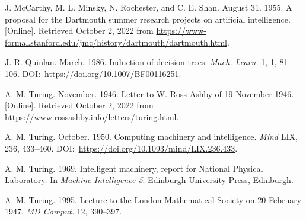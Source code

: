 \begin{thebibliography}{}
 J. McCarthy, M. L. Minsky, N. Rochester, and C. E. Shan. August 31. 1955. A proposal for the Dartmouth summer research projects on artificial intelligence. [Online]. Retrieved October 2, 2022 from \href{https://www-formal.stanford.edu/jmc/history/dartmouth/dartmouth.html}{https://{\allowbreak}www-{\allowbreak}formal.{\allowbreak}stanford.{\allowbreak}edu/{\allowbreak}jmc/{\allowbreak}history/{\allowbreak}dartmouth/{\allowbreak}dartmouth.{\allowbreak}html}.

 J. R. Quinlan. March. 1986. Induction of decision trees. \textit{Mach. Learn.} 1, 1, 81--106. DOI:~\href{https://doi.org/10.1007/BF00116251}{https://{\allowbreak}doi.{\allowbreak}org/{\allowbreak}10.{\allowbreak}1007/{\allowbreak}BF00116251}.

 A. M. Turing. November. 1946. Letter to W. Ross Ashby of 19 November 1946. [Online]. Retrieved October 2, 2022 from \href{https://www.rossashby.info/letters/turing.html}{https://{\allowbreak}www.{\allowbreak}rossashby.{\allowbreak}info/{\allowbreak}letters/{\allowbreak}turing.{\allowbreak}html}.

 A. M. Turing. October. 1950. Computing machinery and intelligence. \textit{Mind} LIX, 236, 433--460. DOI:~\href{https://doi.org/10.1093/mind/LIX.236.433}{https://{\allowbreak}doi.{\allowbreak}org/{\allowbreak}10.{\allowbreak}1093/{\allowbreak}mind/{\allowbreak}LIX.{\allowbreak}236.433}.

 A. M. Turing. 1969. Intelligent machinery, report for National Physical Laboratory. In \textit{Machine Intelligence 5}. Edinburgh University Press, Edinburgh.

 A. M. Turing. 1995. Lecture to the London Mathematical Society on 20 February 1947. \textit{MD Comput. }12, 390--397.

\end{thebibliography}

%

